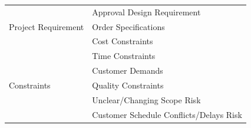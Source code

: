 \begin{table}[!h]
{\begin{tabular}{|llll|}
            \multicolumn{1}{|l|}{}                                                        & \multicolumn{3}{l|}{Approval Design Requirement}                                                                                                                                                          \\ \cline{2-4}
            \multicolumn{1}{|l|}{\multirow{-5}{*}{Project Requirement}}                   & \multicolumn{3}{l|}{Order Specifications}                                                                                                                                                                 \\ \hline
            \multicolumn{1}{|l|}{\cellcolor[HTML]{FFFC9E}}                                & \multicolumn{3}{l|}{\cellcolor[HTML]{FFFC9E}Cost Constraints}                                                                                                                                             \\ \cline{2-4}
            \multicolumn{1}{|l|}{\cellcolor[HTML]{FFFC9E}}                                & \multicolumn{3}{l|}{\cellcolor[HTML]{FFFC9E}Time Constraints}                                                                                                                                             \\ \cline{2-4}
            \multicolumn{1}{|l|}{\cellcolor[HTML]{FFFC9E}}                                & \multicolumn{3}{l|}{\cellcolor[HTML]{FFFC9E}Customer Demands}                                                                                                                                             \\ \cline{2-4}
            \multicolumn{1}{|l|}{\multirow{-4}{*}{\cellcolor[HTML]{FFFC9E}Constraints}}   & \multicolumn{3}{l|}{\cellcolor[HTML]{FFFC9E}Quality Constraints}                                                                                                                                          \\ \hline
            \multicolumn{1}{|l|}{}                                                        & \multicolumn{3}{l|}{Unclear/Changing Scope Risk}                                                                                                                                                          \\ \cline{2-4}
            \multicolumn{1}{|l|}{}                                                        & \multicolumn{3}{l|}{Customer Schedule Conflicts/Delays Risk}                                                                                                                                              \\ \cline{2-4}

\end{tabular}}
\end{table}
